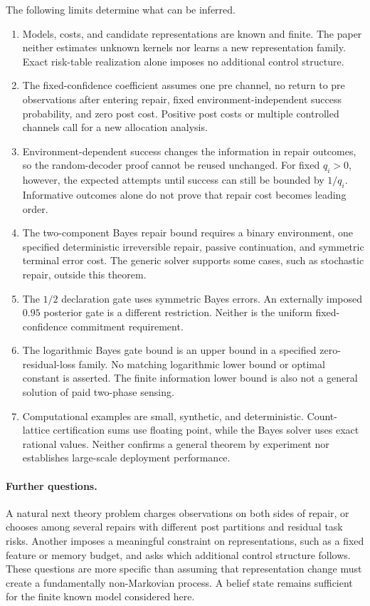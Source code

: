 The following limits determine what can be inferred.
\begin{enumerate}
\item Models, costs, and candidate representations are known and finite.
The paper neither estimates unknown kernels nor learns a new representation
family. Exact risk-table realization alone imposes no additional control
structure.
\item The fixed-confidence coefficient assumes one pre channel, no return to
pre observations after entering repair, fixed environment-independent
success probability, and zero post cost. Positive post costs or multiple
controlled channels call for a new allocation analysis.
\item Environment-dependent success changes the information in repair outcomes,
so the random-decoder proof cannot be reused unchanged. For fixed
$q_i>0$, however, the expected attempts until success can still be bounded
by $1/q_i$. Informative outcomes alone do not prove that repair cost becomes
leading order.
\item The two-component Bayes repair bound requires a binary environment,
one specified deterministic irreversible repair, passive continuation, and
symmetric terminal error cost. The generic solver supports some cases,
such as stochastic repair, outside this theorem.
\item The $1/2$ declaration gate uses symmetric Bayes errors. An externally
imposed $0.95$ posterior gate is a different restriction. Neither is the
uniform fixed-confidence commitment requirement.
\item The logarithmic Bayes gate bound is an upper bound in a specified
zero-residual-loss family. No matching logarithmic lower bound or optimal
constant is asserted. The finite information lower bound is also not a
general solution of paid two-phase sensing.
\item Computational examples are small, synthetic, and deterministic.
Count-lattice certification sums use floating point, while the Bayes solver
uses exact rational values. Neither confirms a general theorem by experiment
nor establishes large-scale deployment performance.
\end{enumerate}

\paragraph{Further questions.}
A natural next theory problem charges observations on both sides of repair,
or chooses among several repairs with different post partitions and residual
task risks. Another imposes a meaningful constraint on representations,
such as a fixed feature or memory budget, and asks which additional control
structure follows. These questions are more specific than assuming that
representation change must create a fundamentally non-Markovian process.
A belief state remains sufficient for the finite known model considered here.

